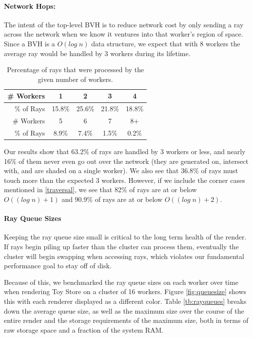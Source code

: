 \documentclass[a4paper,twoside]{article}
\begin{document}
\paragraph{Network Hops:}
The intent of the top-level BVH is to reduce network cost by only sending
a ray across the network when we know it ventures into that worker's region
of space. Since a BVH is a $O(log\;n)$ data structure, we expect that with 8
workers the average ray would be handled by 3 workers during its lifetime.

\begin{table}
\begin{center}
\begin{tabular}{|r||c|c|c|c|}
    \hline
    \# Workers& 1 & 2 & 3 & 4 \\

    \hline
    \% of Rays & 15.8\% & 25.6\% & 21.8\% & 18.8\%\\

        \hline
           \# Workers & 5 & 6 & 7 & 8+ \\
               \hline
                    \% of Rays    & 8.9\% & 7.4\% & 1.5\% & 0.2\% \\
    \hline
\end{tabular}
\caption{Percentage of rays that were processed by the given number of workers.}
\label{tb:nethopspercent}
\end{center}
\end{table}

Our results show that 63.2\% of rays are handled by 3 workers or less, and
nearly 16\% of them never even go out over the network (they are generated on,
intersect with, and are shaded on a single worker). We also see that 36.8\% of
rays must touch more than the expected 3 workers.  However, if we include the 
corner cases mentioned in \ref{traversal}, we see that
82\% of rays are at or below $O((log\;n) + 1)$ and 90.9\% of rays are at or
below $O((log\;n) + 2)$. 

\paragraph{Ray Queue Sizes}
Keeping the ray queue size small is critical to the long term health of the
render. If rays begin piling up faster than the cluster can process them,
eventually the cluster will begin swapping when accessing rays, which violates
our fundamental performance goal to stay off of disk.

Because of this, we benchmarked the ray queue sizes on each worker over time
when rendering Toy Store on a cluster of 16 workers. Figure \ref{fig:queuesize}
shows this with each renderer displayed as a different color. Table \ref{tb:rayqueues}
breaks down the average queue size, as well as the maximum size over the course
of the entire render and the storage requirements of the maximum size, both in
terms of raw storage space and a fraction of the system RAM.
\end{document}
